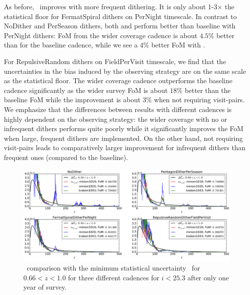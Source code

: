 
As before, \sigmaOS\ improves with more frequent dithering. It is only about 1-3$\times$ the statistical floor for FermatSpiral dithers on PerNight timescale. In contrast to NoDither and PerSeason dithers, both  and  perform better than baseline with PerNight dithers: FoM from the wider coverage cadence is about $4.5\%$ better than for the baseline cadence, while we see a $4\%$ better FoM with .

For RepulsiveRandom dithers on FieldPerVisit timescale, we find that the uncertainties in the bias induced by the observing strategy are on the same scale as the statistical floor. The wider coverage cadence outperforms the baseline cadence significantly as  the wider survey FoM is about $18\%$ better than the baseline FoM while the improvement is about 3$\%$ when not requiring visit-pairs. We emphasize that the differences between results with different cadences is highly dependent on the observing strategy: the wider coverage with no or infrequent dithers performs quite poorly while it significantly improves the FoM when large, frequent dithers are implemented. On the other hand, not requiring visit-pairs leads to comparatively larger improvement for infrequent dithers than frequent ones (compared to the baseline).

\begin{figure}[!htb]
      \centering\includegraphics[width=\linewidth]{figs/awan_1yr_goldSample_3cadences.pdf}
       \vspace*{-2em}
\caption{\sigmaOS\ comparison with the minimum statistical uncertainty \statFloor\ for $0.66<z<1.0$ for three different cadences for $i<25.3$ after only one year of survey.}
\label{fig: cadences: 1yr}
\end{figure}

